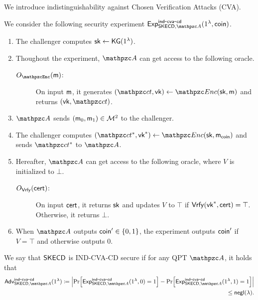We introduce indistinguishability against Chosen Verification Attacks (CVA).
\begin{definition}\label{def:reusable_sk-vo_certified_del}
We consider the following security experiment
$\expc{\CDSKE,\qA}{ind}{cva}{cd}(1^\secp,\coin)$.

\begin{enumerate}
    \item The challenger computes $\mathsf{sk} \leftarrow \mathsf{KG}(1^\lambda)$.
    \item Thoughout the experiment, $\qA$ can get access to the following oracle.
    \begin{description}
    \item[$\Oracle{\qEnc}(\msg)$:] On input $\mathsf{m}$, it generates
    $(\qct, \vk)\gets\qEnc(\sk,\msg)$ and returns $(\vk,\qct)$.  
    \end{description}
    \item $\qA$ sends $(\mathsf{m}_0,\mathsf{m}_1)\in\mathcal{M}^2$ to the challenger. 
    \item The challenger computes $(\qct^*,\vk^*) \la
        \qEnc(\sk,\msg_\coin)$ and sends $\qct^*$ to $\qA$.
    \item Hereafter, $\qA$ can get access to the following oracle, where $V$ is initialized to $\bot$.
    \begin{description}
        \item[$O_{\mathtt{\mathsf{Vrfy}}}(\mathsf{cert})$:] On input $\mathsf{cert}$, it returns $\mathsf{sk}$ and updates $V$ to $\top$ if $\mathsf{Vrfy}(\mathsf{vk}^*,\mathsf{cert})=\top$. Otherwise, it returns $\bot$.
    \end{description}
    \item When $\qA$ outputs $\mathsf{coin}'\in \{0,1\}$, the experiment outputs $\mathsf{coin}^\prime$ if $V=\top$ and otherwise outputs $0$.
\end{enumerate}
We say that $\mathsf{SKECD}$ is IND-CVA-CD secure if for any QPT $\qA$, it holds that
\begin{align}
\advc{\CDSKE,\qA}{ind}{cva}{cd}(1^\secp)\seteq \abs{\Pr[
\expc{\CDSKE,\qA}{ind}{cva}{cd}(1^\secp, 0)=1] - \Pr[
\expc{\CDSKE,\qA}{ind}{cva}{cd}(1^\secp, 1)=1] }\\\le \negl(\secp).
\end{align}
\end{definition}

